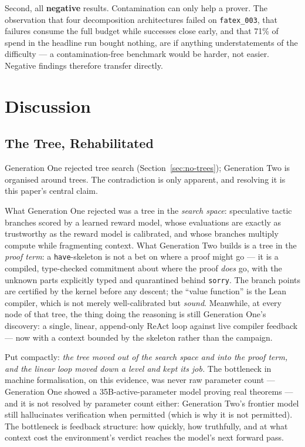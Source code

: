 \documentclass[12pt, a4paper]{article}
\begin{document}
Second, all \textbf{negative} results. Contamination can only help a prover.
The observation that four decomposition architectures failed on
\texttt{fatex\_003}, that failures consume the full budget while successes
close early, and that 71\% of spend in the headline run bought nothing, are
if anything understatements of the difficulty --- a contamination-free
benchmark would be harder, not easier. Negative findings therefore transfer
directly.

\section{Discussion}
\label{sec:discussion}
\subsection{The Tree, Rehabilitated}

Generation One rejected tree search (Section~\ref{sec:no-trees});
Generation Two is organised around trees. The contradiction is only
apparent, and resolving it is this paper's central claim.

What Generation One rejected was a tree in the \emph{search space}:
speculative tactic branches scored by a learned reward model, whose
evaluations are exactly as trustworthy as the reward model is calibrated,
and whose branches multiply compute while fragmenting context. What
Generation Two builds is a tree in the \emph{proof term}: a
\texttt{have}-skeleton is not a bet on where a proof might go --- it is a
compiled, type-checked commitment about where the proof \emph{does} go,
with the unknown parts explicitly typed and quarantined behind
\texttt{sorry}. The branch points are certified by the kernel before any
descent; the ``value function'' is the Lean compiler, which is not merely
well-calibrated but \emph{sound}. Meanwhile, at every node of that tree,
the thing doing the reasoning is still Generation One's discovery: a
single, linear, append-only ReAct loop against live compiler feedback ---
now with a context bounded by the skeleton rather than the campaign.

Put compactly: \emph{the tree moved out of the search space and into the
proof term, and the linear loop moved down a level and kept its job.} The
bottleneck in machine formalisation, on this evidence, was never raw
parameter count --- Generation One showed a 35B-active-parameter model
proving real theorems --- and it is not resolved by parameter count either:
Generation Two's frontier model still hallucinates verification when
permitted (which is why it is not permitted). The bottleneck is feedback
structure: how quickly, how truthfully, and at what context cost the
environment's verdict reaches the model's next forward pass.
\end{document}
